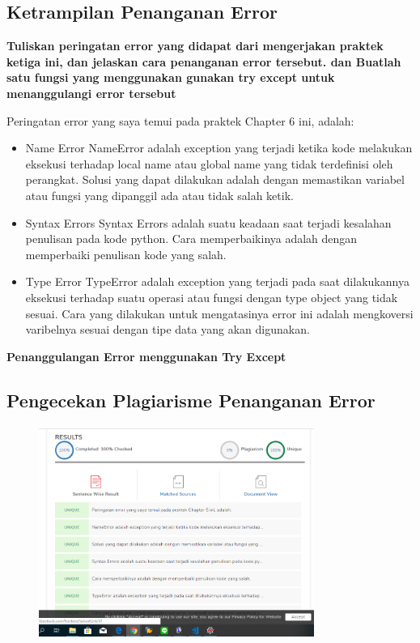 \subsection{Ketrampilan Penanganan Error}
\textbf{Tuliskan peringatan error yang didapat dari mengerjakan praktek ketiga ini, dan jelaskan cara penanganan error tersebut. dan Buatlah satu fungsi yang menggunakan gunakan try except untuk menanggulangi error tersebut}

Peringatan error yang saya temui pada praktek Chapter 6 ini, adalah:
\begin{itemize}
	\item Name Error
	NameError adalah exception yang terjadi ketika kode melakukan eksekusi terhadap local name atau global name yang tidak terdefinisi oleh perangkat. Solusi yang dapat dilakukan adalah dengan memastikan variabel atau fungsi yang dipanggil ada atau tidak salah ketik.
	
	\item Syntax Errors
	Syntax Errors adalah suatu keadaan saat  terjadi kesalahan penulisan pada kode python. Cara memperbaikinya adalah dengan memperbaiki penulisan kode yang salah.
	
	\item Type Error
	TypeError adalah exception yang terjadi pada saat dilakukannya eksekusi terhadap suatu operasi atau fungsi dengan type object yang tidak sesuai. Cara yang dilakukan untuk mengatasinya error ini adalah mengkoversi varibelnya sesuai dengan tipe data yang akan digunakan.
\end{itemize}

\textbf{Penanggulangan Error menggunakan Try Except}


\subsection{Pengecekan Plagiarisme Penanganan Error}
\begin{figure}[H]
	\includegraphics[width=9cm]{figures/6/Praktek/1174096/Plagiarismeerror.png}
	\centering
\end{figure}


